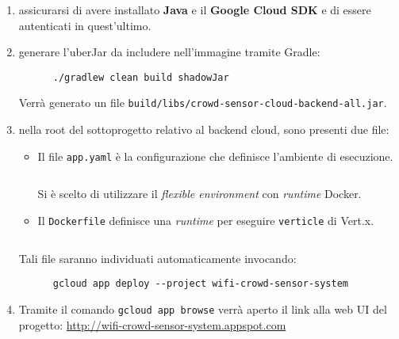 \begin{enumerate}
  \item
    assicurarsi di avere installato \textbf{Java} e il \textbf{Google Cloud SDK} e di essere autenticati in quest'ultimo.
  \item
    generare l'uberJar da includere nell'immagine tramite Gradle:
    \begin{verbatim}
      ./gradlew clean build shadowJar
    \end{verbatim}
    Verrà generato un file \texttt{build/libs/crowd-sensor-cloud-backend-all.jar}.
  \item
    nella root del sottoprogetto relativo al backend cloud, sono presenti due file:
    \begin{itemize}
      \item
        Il file \texttt{app.yaml} è la configurazione che definisce l'ambiente di esecuzione.
        \inputminted[fontsize=\footnotesize,frame=lines,linenos]{yaml}{../cloud-backend/app.yaml}
        Si è scelto di utilizzare il \emph{flexible environment} con \emph{runtime} Docker.
      \item
        Il \texttt{Dockerfile} definisce una \emph{runtime} per eseguire \texttt{verticle} di Vert.x.
        \inputminted[fontsize=\footnotesize,frame=lines,linenos]{dockerfile}{../cloud-backend/Dockerfile}
    \end{itemize}
    Tali file saranno individuati automaticamente invocando:
    \begin{verbatim}
      gcloud app deploy --project wifi-crowd-sensor-system
    \end{verbatim}
  \item
    Tramite il comando \texttt{gcloud app browse} verrà aperto il link alla web UI del progetto:
    \url{http://wifi-crowd-sensor-system.appspot.com}
\end{enumerate}
